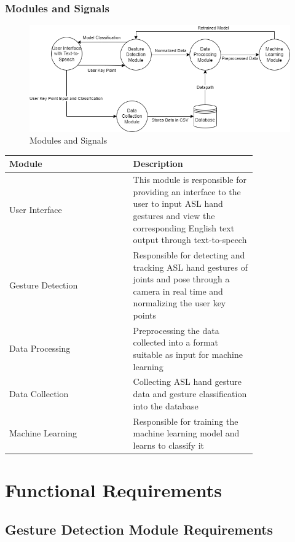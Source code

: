 \documentclass[12pt]{article}
\begin{document}
\subsubsection{Modules and Signals}
\begin{figure}[H] 
\centering
\includegraphics[width=\textwidth,height=0.88\textheight,keepaspectratio]{Modules and Signals.png} 
\caption{Modules and Signals} 
\label{Fig.Modules&Signals} 
\end{figure}

\renewcommand{\arraystretch}{1.2}
\noindent \begin{tabularx}{\textwidth}{p{0.4\linewidth}|p{0.4\linewidth}}
\toprule
\textbf{Module} & \textbf{Description}\\
\midrule
User Interface 
& This module is responsible for providing an interface to the user to input ASL hand gestures and view the corresponding English text output through text-to-speech\\
\hline
Gesture Detection
& Responsible for detecting and tracking ASL hand gestures of joints and pose through a camera in real time and normalizing the user key points\\
\hline
Data Processing
& Preprocessing the data collected into a format suitable as input for machine learning\\
\hline
Data Collection
& Collecting ASL hand gesture data and gesture classification into the database\\
\hline
Machine Learning
& Responsible for training the machine learning model and learns to classify it\\
\bottomrule
\end{tabularx}

\section{Functional Requirements}
\subsection{Gesture Detection Module Requirements}
\end{document}
